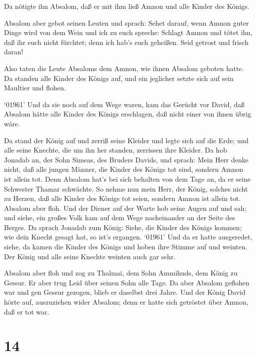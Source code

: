 Da nötigte ihn Absalom, daß er mit ihm ließ Amnon und alle
Kinder des Königs.

 Absalom aber gebot seinen Leuten und sprach: Sehet darauf,
wenn Amnon guter Dinge wird von dem Wein und ich zu euch spreche:
Schlagt Amnon und tötet ihn, daß ihr euch nicht fürchtet; denn ich hab's
euch geheißen. Seid getrost und frisch daran!

 Also taten die Leute Absaloms dem Amnon, wie ihnen Absalom
geboten hatte. Da standen alle Kinder des Königs auf, und ein jeglicher
setzte sich auf sein Maultier und flohen.

 `01961' Und da sie noch auf dem Wege waren, kam das
Gerücht vor David, daß Absalom hätte alle Kinder des Königs erschlagen,
daß nicht einer von ihnen übrig wäre.

 Da stand der König auf und zerriß seine Kleider und legte
sich auf die Erde; und alle seine Knechte, die um ihn her standen,
zerrissen ihre Kleider.  Da hob Jonadab an, der Sohn
Simeas, des Bruders Davids, und sprach: Mein Herr denke nicht, daß alle
jungen Männer, die Kinder des Königs tot sind, sondern Amnon ist allein
tot. Denn Absalom hat's bei sich behalten von dem Tage an, da er seine
Schwester Thamar schwächte.  So nehme nun mein Herr, der
König, solches nicht zu Herzen, daß alle Kinder des Königs tot seien,
sondern Amnon ist allein tot.  Absalom aber floh. Und der
Diener auf der Warte hob seine Augen auf und sah; und siehe, ein großes
Volk kam auf dem Wege nacheinander an der Seite des Berges.
 Da sprach Jonadab zum König: Siehe, die Kinder des Königs
kommen; wie dein Knecht gesagt hat, so ist's ergangen. 
`01961' Und da er hatte ausgeredet, siehe, da kamen die Kinder des
Königs und hoben ihre Stimme auf und weinten. Der König und alle seine
Knechte weinten auch gar sehr.

 Absalom aber floh und zog zu Thalmai, dem Sohn Ammihuds,
dem König zu Gessur. Er aber trug Leid über seinen Sohn alle Tage.
 Da aber Absalom geflohen war und gen Gessur gezogen, blieb
er daselbst drei Jahre.  Und der König David hörte auf,
auszuziehen wider Absalom; denn er hatte sich getröstet über Amnon, daß
er tot war.

\hypertarget{section-13}{%
\section{14}\label{section-13}}

